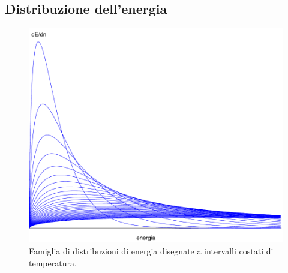 \subsection{Distribuzione dell'energia}
\begin{figure}[htbp]
\centering
\includegraphics[scale=0.7]{immagini/fisica1/energia_max}
\caption{Famiglia di distribuzioni di energia disegnate a intervalli costati di temperatura.}
\end{figure}

